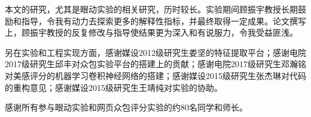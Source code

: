 \begin{thanks}

本文的研究，尤其是眼动实验的相关研究，历时较长。实验期间顾振宇教授长期鼓励和指导，令我有动力去探索更多的解释性指标，并最终取得一定成果。论文撰写上，顾振宇教授的反复修改与指导使结果更为深入和有说服力，令我受益匪浅。

另在实验和工程实现方面，感谢媒设2012级研究生娄坚的特征提取平台；感谢电院2017级研究生邱丰对众包实验平台的搭建上的贡献；感谢电院2017级研究生邓瀚铭对美感评分的机器学习卷积神经网络的搭建；感谢媒设2015级研究生张杰琳对代码的重构意见；感谢媒设2015级研究生王靖纯对实验的协助。

感谢所有参与眼动实验和网页众包评分实验的约80名同学和师长。

\end{thanks}
